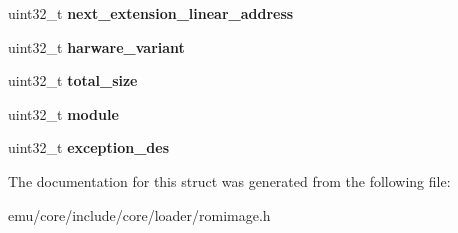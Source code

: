 \begin{DoxyCompactItemize}
\item 
\mbox{\label{structeka2l1_1_1loader_1_1rom__image__header_a6161fdc11c9c0e0866604f63d8f5e63f}} 
uint32\+\_\+t {\bfseries next\+\_\+extension\+\_\+linear\+\_\+address}
\item 
\mbox{\label{structeka2l1_1_1loader_1_1rom__image__header_aeacd417c6fd4289a2433dcfd9cb360f7}} 
uint32\+\_\+t {\bfseries harware\+\_\+variant}
\item 
\mbox{\label{structeka2l1_1_1loader_1_1rom__image__header_a28f0345bdd423c093b6d9f07ac9c8c0b}} 
uint32\+\_\+t {\bfseries total\+\_\+size}
\item 
\mbox{\label{structeka2l1_1_1loader_1_1rom__image__header_ae7ce6af188fb32dade271e5fc3585931}} 
uint32\+\_\+t {\bfseries module}
\item 
\mbox{\label{structeka2l1_1_1loader_1_1rom__image__header_a2a9dd8889a9dee1ea7d7bd2f35e28bad}} 
uint32\+\_\+t {\bfseries exception\+\_\+des}
\end{DoxyCompactItemize}


The documentation for this struct was generated from the following file\+:\begin{DoxyCompactItemize}
\item 
emu/core/include/core/loader/romimage.\+h\end{DoxyCompactItemize}

